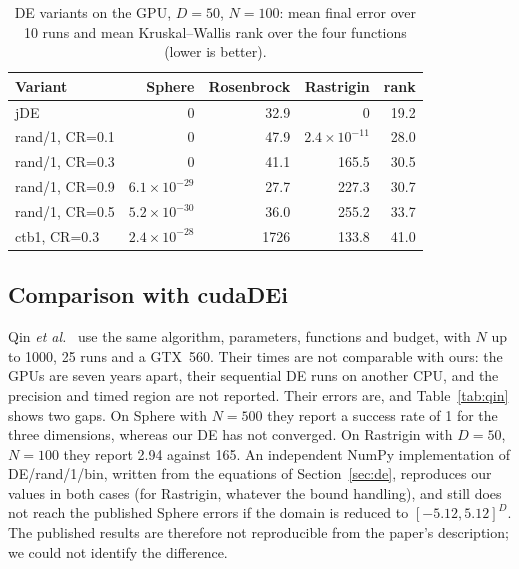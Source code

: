 \documentclass[conference]{IEEEtran}
\begin{document}
\begin{table}[!t]
\centering
\caption{DE variants on the GPU, $D=50$, $N=100$: mean final error over 10 runs and mean
Kruskal--Wallis rank over the four functions (lower is better).}
\label{tab:var}
\footnotesize\setlength{\tabcolsep}{3pt}
\begin{tabular}{lrrrr}
\toprule
Variant & Sphere & Rosenbrock & Rastrigin & rank\\
\midrule
jDE            & 0                 & 32.9  & 0                    & 19.2\\
rand/1, CR=0.1 & 0                 & 47.9  & $2.4\times10^{-11}$  & 28.0\\
rand/1, CR=0.3 & 0                 & 41.1  & 165.5                & 30.5\\
rand/1, CR=0.9 & $6.1\times10^{-29}$ & 27.7 & 227.3               & 30.7\\
rand/1, CR=0.5 & $5.2\times10^{-30}$ & 36.0 & 255.2               & 33.7\\
ctb1, CR=0.3   & $2.4\times10^{-28}$ & 1726 & 133.8               & 41.0\\
\bottomrule
\end{tabular}
\end{table}

\subsection{Comparison with cudaDEi}
Qin \emph{et al.}~\cite{qin2012} use the same algorithm, parameters, functions and budget, with
$N$ up to 1000, 25 runs and a GTX~560. Their times are not comparable with ours: the GPUs are
seven years apart, their sequential DE runs on another CPU, and the precision and timed region
are not reported. Their errors are, and Table~\ref{tab:qin} shows two gaps. On
Sphere with $N=500$ they report a success rate of 1 for the three dimensions, whereas our DE has
not converged. On Rastrigin with $D=50$, $N=100$ they report 2.94 against 165. An independent
NumPy implementation of DE/rand/1/bin, written from the equations of Section~\ref{sec:de},
reproduces our values in both cases (for Rastrigin, whatever the bound handling), and still does not reach the
published Sphere errors if the domain is reduced to $[-5.12,5.12]^D$. The published results are
therefore not reproducible from the paper's description; we could not identify the difference.
\end{document}
